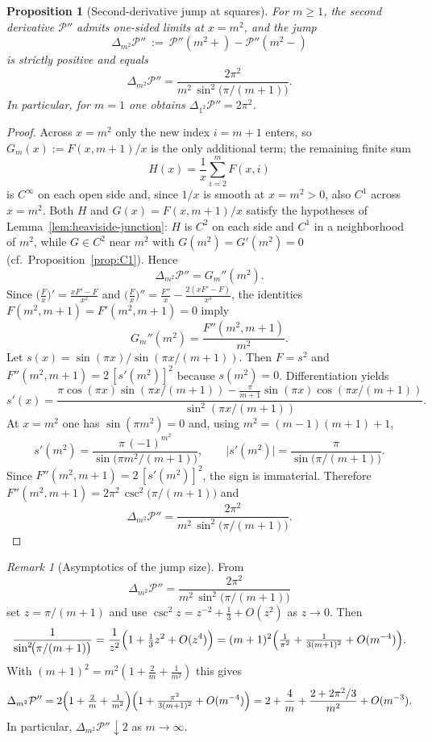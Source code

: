 \documentclass[11pt,a4paper]{amsart}
\theoremstyle{plain}
\newtheorem{proposition}[theorem]{Proposition}
\theoremstyle{definition}
\theoremstyle{remark}
\newtheorem{remark}[theorem]{Remark}
\begin{document}
\begin{proposition}[Second-derivative jump at squares]\label{prop:second}
For $m\ge1$, the second derivative $\mathcal P''$ admits one-sided limits at $x=m^2$, and the jump
\[
\Delta_{m^2}\mathcal P''\ :=\ \mathcal P''(m^2{+})-\mathcal P''(m^2{-})
\]
is strictly positive and equals
\[
\Delta_{m^2}\mathcal{P}''=\frac{2\pi^2}{m^2\,\sin^2\!\bigl(\pi/(m+1)\bigr)}.
\]
In particular, for $m=1$ one obtains $\Delta_{1^2}\mathcal P''=2\pi^2$.
\end{proposition}

\begin{proof}
Across $x=m^2$ only the new index $i=m{+}1$ enters, so $G_m(x):=F(x,m{+}1)/x$ is the only additional term; the remaining finite sum
\[
H(x)=\frac{1}{x}\sum_{i=2}^{m}F(x,i)
\]
is $C^\infty$ on each open side and, since $1/x$ is smooth at $x=m^2>0$, also $C^1$ across $x=m^2$. Both $H$ and $G(x)=F(x,m{+}1)/x$ satisfy the hypotheses of Lemma~\ref{lem:heaviside-junction}: $H$ is $C^2$ on each side and $C^1$ in a neighborhood of $m^2$, while $G\in C^2$ near $m^2$ with $G(m^2)=G'(m^2)=0$ (cf.\ Proposition~\ref{prop:C1}). Hence
\[
\Delta_{m^2}\mathcal P''=G_m''(m^2).
\]
Since $\bigl(\tfrac{F}{x}\bigr)'=\frac{xF'-F}{x^2}$ and $\bigl(\tfrac{F}{x}\bigr)''=\frac{F''}{x}-\frac{2(xF'-F)}{x^3}$, the identities $F(m^2,m{+}1)=F'(m^2,m{+}1)=0$ imply
\[
G_m''(m^2)=\frac{F''(m^2,m{+}1)}{m^2}.
\]
Let $s(x)=\sin(\pi x)/\sin(\pi x/(m{+}1))$. Then $F=s^2$ and $F''(m^2,m{+}1)=2\,[s'(m^2)]^2$ because $s(m^2)=0$. Differentiation yields
\[
s'(x)=\frac{\pi\cos(\pi x)\sin(\pi x/(m{+}1))-\frac{\pi}{m{+}1}\sin(\pi x)\cos(\pi x/(m{+}1))}{\sin^2(\pi x/(m{+}1))}.
\]
At $x=m^2$ one has $\sin(\pi m^2)=0$ and, using $m^2=(m-1)(m{+}1)+1$,
\[
s'(m^2)=\frac{\pi\,(-1)^{m^2}}{\sin\!\bigl(\pi m^2/(m{+}1)\bigr)},
\qquad
\bigl|s'(m^2)\bigr|=\frac{\pi}{\sin\!\bigl(\pi/(m{+}1)\bigr)}.
\]
Since $F''(m^2,m{+}1)=2\,[s'(m^2)]^2$, the sign is immaterial.
Therefore $F''(m^2,m{+}1)=2\pi^2\,\csc^2\!\bigl(\pi/(m{+}1)\bigr)$ and
\[
\Delta_{m^2}\mathcal P''=\frac{2\pi^2}{m^2\,\sin^2\!\bigl(\pi/(m{+}1)\bigr)}.
\]
\end{proof}

\begin{remark}[Asymptotics of the jump size]
From
\[
\Delta_{m^2}\mathcal{P}''=\frac{2\pi^2}{m^2\,\sin^2\!\bigl(\pi/(m+1)\bigr)}
\]
set $z=\pi/(m+1)$ and use $\csc^2 z=z^{-2}+\frac{1}{3}+O(z^2)$ as $z\to 0$. Then
\[
\frac{1}{\sin^2\!\bigl(\pi/(m+1)\bigr)}
=\frac{1}{z^2}\Bigl(1+\tfrac{1}{3}z^2+O(z^4)\Bigr)
=(m+1)^2\Bigl(\tfrac{1}{\pi^2}+\tfrac{1}{3(m+1)^2}+O(m^{-4})\Bigr).
\]
With $(m+1)^2=m^2(1+\tfrac{2}{m}+\tfrac{1}{m^2})$ this gives
\[
\Delta_{m^2}\mathcal{P}''=2\Bigl(1+\tfrac{2}{m}+\tfrac{1}{m^2}\Bigr)\Bigl(1+\tfrac{\pi^2}{3(m+1)^2}+O(m^{-4})\Bigr)
=2+\frac{4}{m}+\frac{2+2\pi^2/3}{m^2}+O(m^{-3}).
\]
In particular, $\Delta_{m^2}\mathcal P''\downarrow 2$ as $m\to\infty$.
\end{remark}
\end{document}
